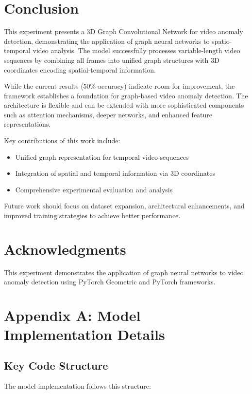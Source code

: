 \documentclass[11pt,a4paper]{article}
\begin{document}
\section{Conclusion}

This experiment presents a 3D Graph Convolutional Network for video anomaly detection, demonstrating the application of graph neural networks to spatio-temporal video analysis. The model successfully processes variable-length video sequences by combining all frames into unified graph structures with 3D coordinates encoding spatial-temporal information.

While the current results (50\% accuracy) indicate room for improvement, the framework establishes a foundation for graph-based video anomaly detection. The architecture is flexible and can be extended with more sophisticated components such as attention mechanisms, deeper networks, and enhanced feature representations.

Key contributions of this work include:
\begin{itemize}
    \item Unified graph representation for temporal video sequences
    \item Integration of spatial and temporal information via 3D coordinates
    \item Comprehensive experimental evaluation and analysis
\end{itemize}

Future work should focus on dataset expansion, architectural enhancements, and improved training strategies to achieve better performance.

\section*{Acknowledgments}

This experiment demonstrates the application of graph neural networks to video anomaly detection using PyTorch Geometric and PyTorch frameworks.

\newpage
\section*{Appendix A: Model Implementation Details}

\subsection*{Key Code Structure}

The model implementation follows this structure:
\end{document}
